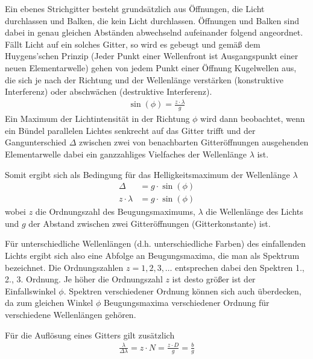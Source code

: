 \documentclass{article}
\begin{document}
Ein ebenes Strichgitter besteht grundsätzlich aus Öffnungen, die Licht durchlassen und Balken, die kein Licht durchlassen. Öffnungen und Balken sind dabei in genau gleichen Abständen abwechselnd aufeinander folgend angeordnet. Fällt Licht auf ein solches Gitter, so wird es gebeugt und gemäß dem Huygens'schen Prinzip (Jeder Punkt einer Wellenfront ist Ausgangspunkt einer neuen Elementarwelle) gehen von jedem Punkt einer Öffnung Kugelwellen aus, die sich je nach der Richtung und der Wellenlänge verstärken (konstruktive Interferenz) oder abschwächen (destruktive Interferenz).
\begin{align}
\label{eq:gitterkonst}
\sin(\phi) = \frac{z\cdot\lambda}{g}
\end{align}
Ein Maximum der Lichtintensität in der Richtung $\phi$ wird dann beobachtet, wenn ein Bündel parallelen Lichtes senkrecht auf das Gitter trifft und der Gangunterschied $\Delta$ zwischen zwei von benachbarten Gitteröffnungen ausgehenden Elementarwelle dabei ein ganzzahliges Vielfaches der Wellenlänge $\lambda$ ist.

Somit ergibt sich als Bedingung für das Helligkeitsmaximum der Wellenlänge $\lambda$
\begin{align}
\Delta &= g\cdot \sin(\phi)\\
z\cdot\lambda &= g\cdot\sin(\phi)
\end{align}
wobei $z$ die Ordnungszahl des Beugungsmaximums, $\lambda$ die Wellenlänge des Lichts und $g$ der Abstand zwischen zwei Gitteröffnungen (Gitterkonstante) ist.

Für unterschiedliche Wellenlängen (d.h. unterschiedliche Farben) des einfallenden Lichts ergibt sich also eine Abfolge an Beugungsmaxima, die man als Spektrum bezeichnet. Die Ordnungszahlen $z = 1,2,3,\dots$ entsprechen dabei den Spektren 1., 2., 3. Ordnung. Je höher die Ordnungszahl $z$ ist desto größer ist der Einfallswinkel $\phi$. Spektren verschiedener Ordnung können sich auch überdecken, da zum gleichen Winkel $\phi$ Beugungsmaxima verschiedener Ordnung für verschiedene Wellenlängen gehören.

Für die Auflösung eines Gitters gilt zusätzlich
\begin{align}
\label{eq:aufl_gitter}
\frac{\lambda}{\Delta \lambda} = z\cdot N = \frac{z\cdot D}{g} =  \frac{b}{g}
\end{align}
\end{document}
